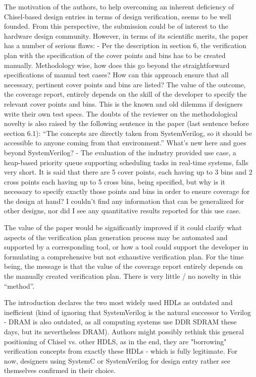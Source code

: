 \documentclass[runningheads]{llncs}
\begin{document}
The motivation of the authors, to help overcoming an inherent deficiency of Chisel-based design entries in terms of design verification, seems to be well founded. From this perspective, the submission could be of interest to the hardware design community. However, in terms of its scientific merits, the paper has a number of serious flaws:
- Per the description in section 6, the verification plan with the specification of the cover points and bins has to be created manually. Methodology wise, how does this go beyond the straightforward specifications of manual test cases? How can this approach ensure that all necessary, pertinent cover points and bins are listed? The value of the outcome, the coverage report, entirely depends on the skill of the developer to specify the relevant cover points and bins. This is the known and old dilemma if designers write their own test specs. The doubts of the reviewer on the methodological novelty is also raised by the following sentence in the paper (last sentence before section 6.1): ``The concepts are directly taken from SystemVerilog, so it should be accessible to anyone coming from that environment.'' What's new here and goes beyond SystemVerilog?
- The evaluation of the industry provided use case, a heap-based priority queue supporting scheduling tasks in real-time systems, falls very short. It is said that there are 5 cover points, each having up to 3 bins and 2 cross points each having up to 5 cross bins, being specified, but why is it necessary to specify exactly those points and bins in order to ensure coverage for the design at hand? I couldn't find any information that can be generalized for other designs, nor did I see any quantitative results reported for this use case.

The value of the paper would be significantly improved if it could clarify what aspects of the verification plan generation process may be automated and supported by a corresponding tool, or how a tool could support the developer in formulating a comprehensive but not exhaustive verification plan. For the time being, the message is that the value of the coverage report entirely depends on the manually created verification plan. There is very little / no novelty in this ``method''. 

The introduction declares the two most widely used HDLs as outdated and inefficient (kind of ignoring that SystemVerilog is the natural successor to Verilog - DRAM is also outdated, as all computing systems use DDR SDRAM these days, but its nevertheless DRAM). Authors might possibly rethink this general positioning of Chisel vs. other HDLS, as in the end, they are  "borrowing" verification concepts from exactly these HDLs - which is fully legitimate. For now, designers using SystemC or SystemVerilog for design entry rather see themselves confirmed in their choice.
\end{document}
